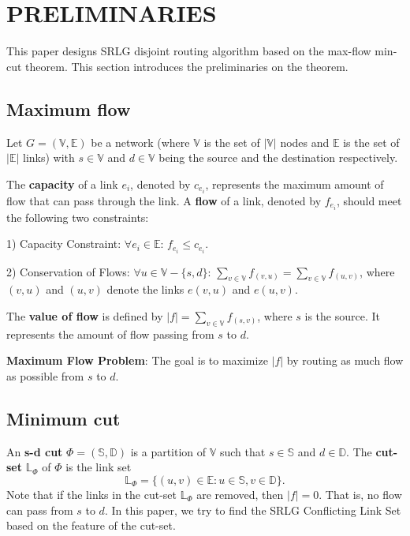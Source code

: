 \section{PRELIMINARIES}
\label{sec:PRELIMINARIES}
This paper designs   SRLG disjoint routing algorithm based on the max-flow min-cut theorem. This section introduces the preliminaries on the theorem.
\subsection{Maximum flow}
Let $G=(\mathbb{\mathbb{V}},\mathbb{\mathbb{E}})$ be a network (where $\mathbb{\mathbb{V}}$ is the set of $|\mathbb{\mathbb{V}}|$ nodes  and $\mathbb{\mathbb{E}}$ is the set of $|\mathbb{\mathbb{E}}|$ links) with $s\in \mathbb{V}$ and $d\in \mathbb{V}$ being the source and the destination respectively.

The \textbf{capacity} of a link $e_i$, denoted by $c_{e_i}$, represents the maximum amount of flow that can pass through the link. A \textbf{flow}  of a link, denoted by $f_{e_i}$, should meet the following two constraints:

1) Capacity Constraint: $\forall e_i\in \mathbb{\mathbb{E}}$: $f_{e_i}\leq c_{e_i}$.

2) Conservation of Flows: $\forall u\in \mathbb{\mathbb{V}}-\{s,d\}$: $\sum\limits_{v\in \mathbb{V}}f_{(v,u)}=\sum\limits_{v\in \mathbb{V}}f_{(u,v)}$, where $(v,u)$ and $(u,v)$ denote the links $e(v,u)$ and $e(u,v)$.

The \textbf{value of flow} is defined by $|f|=\sum\limits_{v\in \mathbb{V}}f_{(s,v)}$, where $s$ is the source. It represents the amount of flow passing from   $s$ to   $d$.

\textbf{Maximum Flow Problem}: The goal is to maximize $|f|$ by routing as much flow as possible from $s$ to $d$.
\subsection{Minimum cut}
An \textbf{s-d cut} ${\Phi}=(\mathbb{S},\mathbb{D})$  is a partition of $\mathbb{V}$ such that $s \in \mathbb{S}$ and $d \in \mathbb{D}$. The \textbf{cut-set} $\mathbb{\mathbb{L}}_{\Phi}$ of $\Phi$ is the link set
\begin{equation}
\mathbb{\mathbb{L}}_{\Phi}=\{(u,v)\in \mathbb{E}: u \in \mathbb{S}, v \in \mathbb{D}\}.
\end{equation}
Note that if the links in the cut-set $\mathbb{\mathbb{L}}_{\Phi}$ are removed, then $|f| = 0$. That is, no flow can pass from $s$ to $d$. In this paper,  we try to find the SRLG Conflicting Link Set based on the feature of the cut-set.


